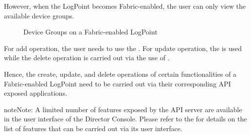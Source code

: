\documentclass[letterpaper,10pt,oneside,english]{sphinxmanual}
\begin{document}
However, when the LogPoint becomes Fabric-enabled, the user can only view the available device groups.

\begin{figure}[H]
\centering
\capstart

\noindent{}
\caption{Device Groups on a Fabric-enabled LogPoint}\label{\detokenize{applicationnote:id3}}\end{figure}

For add operation, the user needs to use the . For update operation, the  is used while the delete operation is carried out via the use of .

Hence, the create, update, and delete operations of certain functionalities of a Fabric-enabled LogPoint need to be carried out via their corresponding API exposed applications.

\begin{sphinxadmonition}{note}{Note:}
A limited number of features exposed by the API server are available in the user interface of the Director Console. Please refer to the  for details on the list of features that can be carried out via its user interface.
\end{sphinxadmonition}
\end{document}
